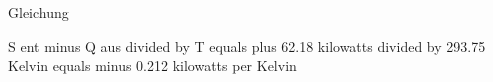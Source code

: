 Gleichung

S ent minus Q aus divided by T equals plus 62.18 kilowatts divided by 293.75 Kelvin equals minus 0.212 kilowatts per Kelvin